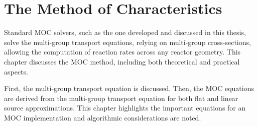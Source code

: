 \chapter{The Method of Characteristics}
\label{chap:moc}

Standard \ac{MOC} solvers, such as the one developed and discussed in this thesis, solve the multi-group transport equations, relying on multi-group cross-sections, allowing the computation of reaction rates across any reactor geometry. This chapter discusses the \ac{MOC} method, including both theoretical and practical aspects.

First, the multi-group transport equation is discussed. Then, the \ac{MOC} equations are derived from the multi-group transport equation for both flat and linear source approximations. This chapter highlights the important equations for an \ac{MOC} implementation and algorithmic considerations are noted.





